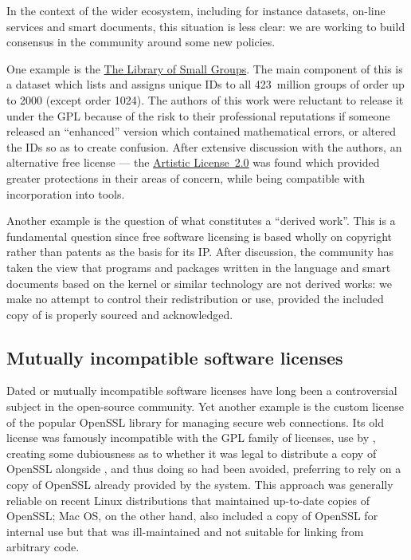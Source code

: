 \documentclass{deliverablereport}
\begin{document}
In the context of the wider \ODK
ecosystem, including for instance datasets, on-line services and smart
documents, this situation is less clear: we are working to build
consensus in the \GAP community around some new policies.

One example is the \href{https://www.gap-system.org/Packages/smallgrp.html}{The Library of Small Groups}. The main
component of this is a dataset which lists and assigns unique IDs to
all 423~million groups of order up to 2000 (except order 1024). The
authors of this work were reluctant to release it under the GPL
because of the risk to their professional reputations if someone
released an ``enhanced'' version which contained mathematical errors,
or altered the IDs so as to create confusion. After extensive
discussion with the authors, an alternative free license --- the
\href{https://opensource.org/licenses/Artistic-2.0}{Artistic License~2.0}
was found which provided greater
protections in their areas of concern, while being compatible with
incorporation into \ODK tools.

Another example is the question of what constitutes a ``derived
work''. This is a fundamental question since free software licensing is based
wholly on copyright rather than patents as the basis for its IP. After
discussion, the \GAP community has taken the view that programs and
packages written in the \GAP language and smart documents based on
the \GAP \Jupyter kernel or similar technology are not derived works:
we make no attempt to control
their redistribution or use, provided the included copy of \GAP is
properly sourced and acknowledged.

\subsection{Mutually incompatible software licenses}

Dated or mutually incompatible software licenses have long been a
controversial subject in the open-source community. Yet another example
is the custom license of the popular OpenSSL library for managing secure
web connections.  Its old license was famously incompatible with the GPL
family of licenses, use by \Sage, creating some dubiousness as to whether
it was legal to distribute a copy of OpenSSL alongside \Sage, and thus
doing so had been avoided, preferring to rely on a copy of OpenSSL already
provided by the system.  This approach was generally reliable on recent
Linux distributions that maintained up-to-date copies of OpenSSL; Mac OS,
on the other hand, also included a copy of OpenSSL for internal use but that
was ill-maintained and not suitable for linking from arbitrary code.
\end{document}
